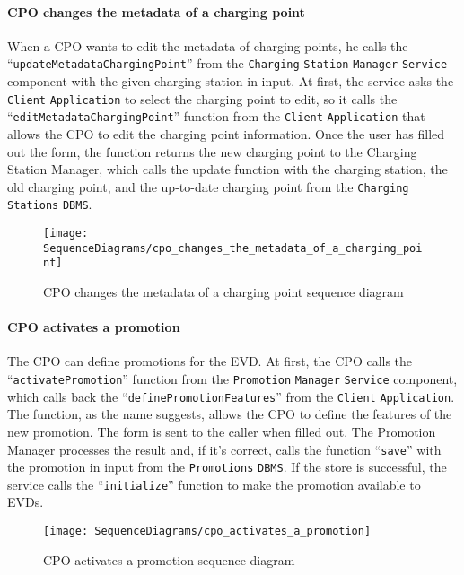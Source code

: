 \paragraph{CPO changes the metadata of a charging point}
When a CPO wants to edit the metadata of charging points, he calls the ``\verb|updateMetadataChargingPoint|'' from the \verb|Charging| \verb|Station| \verb|Manager| \verb|Service| component with the given charging station in input.
At first, the service asks the \verb|Client| \verb|Application| to select the charging point to edit, so it calls the ``\verb|editMetadataChargingPoint|'' function from the \verb|Client| \verb|Application| that allows the CPO to edit the charging point information.
Once the user has filled out the form, the function returns the new charging point to the Charging Station Manager, which calls the update function with the charging station, the old charging point, and the up-to-date charging point from the \verb|Charging| \verb|Stations| \verb|DBMS|\@.
\begin{figure}[H]
    \begin{center}
        \texttt{[image: SequenceDiagrams/cpo\_changes\_the\_metadata\_of\_a\_charging\_point]}
        \caption{CPO changes the metadata of a charging point sequence diagram}
        \label{cpo_changes_metadata_of_charging_point}
    \end{center}
\end{figure}

\paragraph{CPO activates a promotion}
The CPO can define promotions for the EVD\@.
At first, the CPO calls the ``\verb|activatePromotion|'' function from the \verb|Promotion| \verb|Manager| \verb|Service| component, which calls back the ``\verb|definePromotionFeatures|'' from the \verb|Client| \verb|Application|.
The function, as the name suggests, allows the CPO to define the features of the new promotion.
The form is sent to the caller when filled out.
The Promotion Manager processes the result and, if it's correct, calls the function ``\verb|save|'' with the promotion in input from the \verb|Promotions| \verb|DBMS|\@.
If the store is successful, the service calls the ``\verb|initialize|'' function to make the promotion available to EVDs\@.
\begin{figure}[H]
    \begin{center}
        \texttt{[image: SequenceDiagrams/cpo\_activates\_a\_promotion]}
        \caption{CPO activates a promotion sequence diagram}
        \label{cpo_activates_promotion}
    \end{center}
\end{figure}

